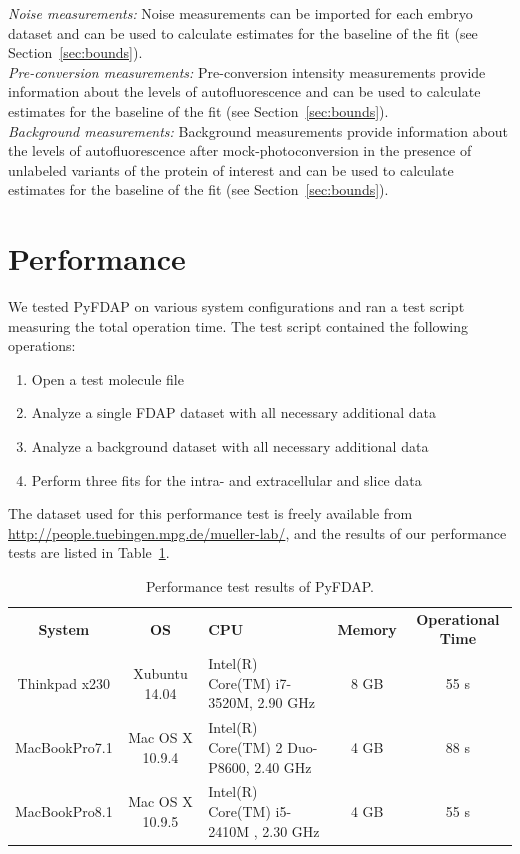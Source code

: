 \documentclass[a4paper,11pt]{article}
\begin{document}
\noindent \textit{Noise measurements:} Noise measurements can be imported for each embryo dataset and can be used to calculate estimates for the baseline of the fit (see Section~\ref{sec:bounds}).\\

\noindent \textit{Pre-conversion measurements:} Pre-conversion intensity measurements provide information about the levels of autofluorescence and can be used to calculate estimates for the baseline of the fit (see Section~\ref{sec:bounds}).\\

\noindent \textit{Background measurements:} Background measurements provide information about the levels of autofluorescence after mock-photoconversion in the presence of unlabeled variants of the protein of interest and can be used to calculate estimates for the baseline of the fit (see Section~\ref{sec:bounds}).
 
\section{Performance}
\label{sec:performance}
We tested PyFDAP on various system configurations and ran a test script measuring the total operation time. The test script contained the following operations:

\begin{enumerate}
 \item Open a test molecule file
 \item Analyze a single FDAP dataset with all necessary additional data
 \item Analyze a background dataset with all necessary additional data
 \item Perform three fits for the intra- and extracellular and slice data
\end{enumerate}

\noindent The dataset used for this performance test is freely available from \url{http://people.tuebingen.mpg.de/mueller-lab/}, and the results of our performance tests are listed in Table~\ref{tab:time}.

\begin{table} [H]
  \small
  \centering
 \begin{tabular}{c|c|p{4cm}|c|c}
\textbf{System} & \textbf{OS} & \textbf{CPU} & \textbf{Memory} & \textbf{Operational Time} \\
 \hhline{=|=|=|=|=}
Thinkpad x230 & Xubuntu 14.04 & \centering Intel(R) Core(TM) i7-3520M, 2.90 GHz & 8 GB & 55 s \\
\hline
MacBookPro7.1 & Mac OS X 10.9.4 & \centering  Intel(R) Core(TM) 2 Duo-P8600, 2.40 GHz & 4 GB & 88 s \\
\hline
MacBookPro8.1 & Mac OS X 10.9.5 & \centering  Intel(R) Core(TM) i5-2410M , 2.30 GHz & 4 GB & 55 s \\
\end{tabular}
\caption{Performance test results of PyFDAP.}
\label{tab:time}
\end{table} 
\end{document}
